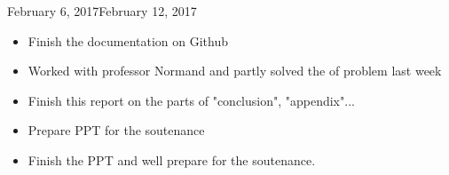 \begin{fichesuivi}{February 6, 2017}{February 12, 2017}

   \begin{travaileffectue}
        \begin{itemize}
            \item Finish the documentation on Github
            \item Worked with professor Normand and partly solved the of problem last week 
            \item Finish this report on the parts of "conclusion", "appendix"...
        \end{itemize}
   \end{travaileffectue}

   \begin{travailnoneffectue}
        \begin{itemize}
             \item Prepare PPT for the soutenance
        \end{itemize}
   \end{travailnoneffectue}

 
   \begin{planification}
        \begin{itemize}
            \item Finish the PPT and well prepare for the soutenance. 
        \end{itemize}
   \end{planification}
\end{fichesuivi}




\begin{comment}
   The summary table of work dedicated to the project is \emph{mandatory}.
If you do not use the provided weekly report sheets, you must establish the summary by yourself.
Otherwise, the simple command that follows in the source code (\verb+\printweeksummary+) does all the job of generating the table along with all the hyperlinks to the weekly reports.

\end{comment}


\printweeksummary